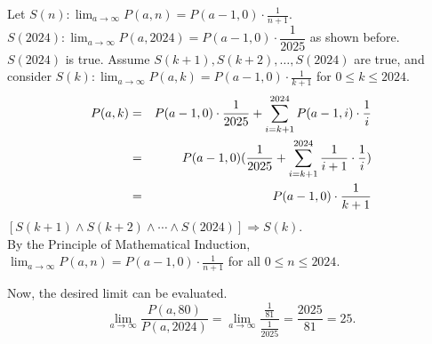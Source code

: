 \documentclass[12pt, oneside]{article}
\begin{document}
Let $S(n): \displaystyle \lim_{a \rightarrow \infty} P(a, n) = P(a-1, 0) \cdot \frac{1}{n+1}$.\\
$\displaystyle S(2024): \lim_{a \rightarrow \infty} P(a, 2024) = P(a-1, 0) \cdot \dfrac{1}{2025}$ as shown before. $S(2024)$ is true.
Assume $S(k+1), S(k+2), \dots , S(2024)$ are true, and consider $S(k): \displaystyle \lim_{a \rightarrow \infty} P(a, k) = P(a-1, 0) \cdot \frac{1}{k+1}$ for $0 \leq k \leq 2024$.
\begin{eqnarray*}
\displaystyle P(a, k) &=& P(a-1, 0) \cdot \frac{1}{2025} + \sum_{i=k+1}^{2024} P(a-1, i) \cdot \frac{1}{i}\\
\displaystyle &=& P(a-1, 0) (\frac{1}{2025} + \sum_{i=k+1}^{2024} \frac{1}{i+1} \cdot \frac{1}{i})\\
\displaystyle &=& P(a-1, 0) \cdot \frac{1}{k+1}\\
\end{eqnarray*}
$[S(k+1) \wedge S(k+2) \wedge \cdots \wedge S(2024)] \Rightarrow S(k).$\\
By the Principle of Mathematical Induction, $\displaystyle \lim_{a \rightarrow \infty} P(a, n) = P(a-1, 0) \cdot \frac{1}{n+1}$ for all $0 \leq n \leq 2024$.

Now, the desired limit can be evaluated.
\[\lim_{a \rightarrow \infty} \frac{P(a, 80)}{P(a, 2024)} = \lim_{a \rightarrow \infty} \frac{\frac{1}{81}}{\frac{1}{2025}} = \frac{2025}{81} = 25.\]
\pagebreak
\end{document}
